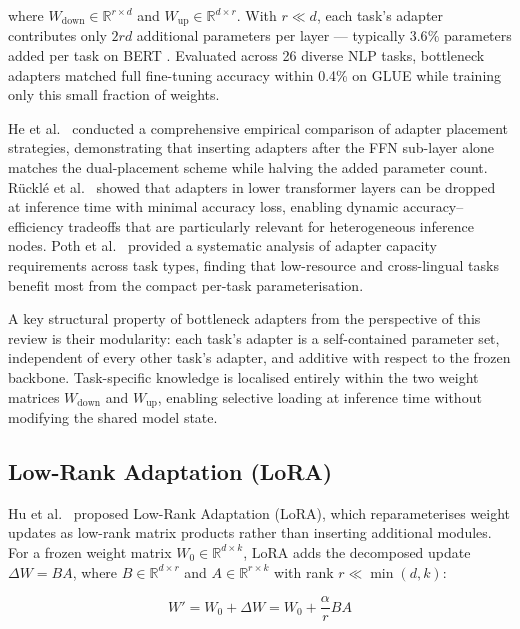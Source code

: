 where $W_\mathrm{down} \in \mathbb{R}^{r \times d}$ and $W_\mathrm{up} \in
\mathbb{R}^{d \times r}$. With $r \ll d$, each task's adapter contributes only
$2rd$ additional parameters per layer --- typically $3.6\%$ parameters
added per task on BERT
\cite{Houlsby2019}. Evaluated across 26 diverse NLP tasks,
bottleneck adapters matched full fine-tuning accuracy within 0.4\% on GLUE \cite{WangGLUE2018} while
training only this small fraction of weights.

He et al.~\cite{HeEffectiveness2021} conducted a comprehensive empirical comparison of adapter
placement strategies, demonstrating that inserting adapters after the FFN sub-layer
alone matches the dual-placement scheme while halving the added parameter count.
R{\"u}ckl{\'e} et al.~\cite{RuckleAdapterDrop2021} showed that adapters in lower transformer layers can be
dropped at inference time with minimal accuracy loss, enabling dynamic accuracy--efficiency
tradeoffs that are particularly relevant for heterogeneous inference nodes.
Poth et al.~\cite{PothAdapters2023} provided a systematic analysis of adapter capacity requirements
across task types, finding that low-resource and cross-lingual tasks benefit most from
the compact per-task parameterisation.

A key structural property of bottleneck adapters from the perspective of this review is
their modularity: each task's adapter is a self-contained parameter set, independent of
every other task's adapter, and additive with respect to the frozen backbone.
Task-specific knowledge is localised entirely within the two weight matrices
$W_\mathrm{down}$ and $W_\mathrm{up}$, enabling selective loading at inference time
without modifying the shared model state.

\subsection{Low-Rank Adaptation (LoRA)}
\label{sec:peft:lora}

Hu et al.~\cite{Hu2022} proposed Low-Rank Adaptation (LoRA), which reparameterises weight updates
as low-rank matrix products rather than inserting additional modules. For a frozen
weight matrix $W_0 \in \mathbb{R}^{d \times k}$, LoRA adds the decomposed update
$\Delta W = BA$, where $B \in \mathbb{R}^{d \times r}$ and $A \in \mathbb{R}^{r \times k}$
with rank $r \ll \min(d, k)$:

\begin{equation}
W' = W_0 + \Delta W = W_0 + \frac{\alpha}{r} BA
\label{eq:lora_intro}
\end{equation}

